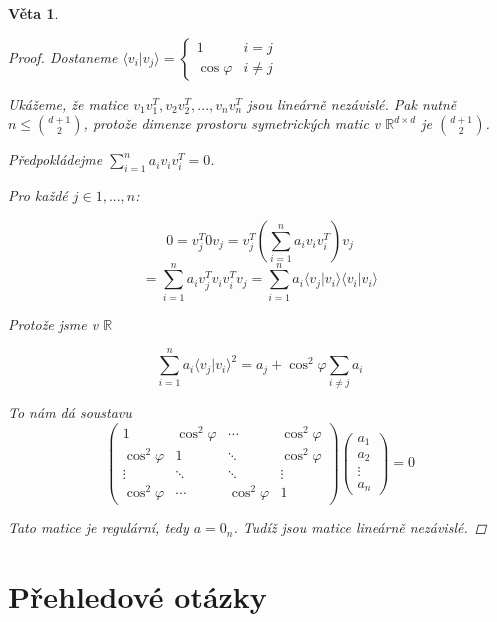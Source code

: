 \documentclass[10pt,a4paper]{article}
\theoremstyle{plain}
\newtheorem{veta}{Věta}
\begin{document}
\begin{enumerate}
\begin{veta}
\begin{proof}
Dostaneme $\langle v_i | v_j \rangle = \begin{cases} 1 & i=j \\ \cos \varphi & i \neq j \end{cases}$

\hfill

Ukážeme, že matice $v_1v_1^T, v_2v_2^T, ..., v_nv_n^T$ jsou lineárně nezávislé. Pak nutně $n \leq \binom{d+1}{2}$, protože dimenze prostoru symetrických matic v $\mathbb{R}^{d \times d}$ je $\binom{d+1}{2}$.

\hfill

Předpokládejme $\sum^n_{i=1}a_iv_iv_i^T = 0$.

Pro každé $j \in 1, ..., n$:

\[ 0 = v_j^T0v_j = v_j^T\left( \sum^n_{i=1}a_iv_iv_i^T \right) v_j \]
\[=  \sum^n_{i=1}a_i v_j^Tv_iv_i^Tv_j = \sum^n_{i=1}a_i \langle v_j | v_i \rangle \langle v_i | v_i \rangle
\]

Protože jsme v $\mathbb{R}$

\[ \sum^n_{i=1}a_i \langle v_j | v_i \rangle^2 = a_j + \cos^2 \varphi \sum_{i \neq j} a_i
\]

To nám dá soustavu
\[
\begin{pmatrix}
1 & \cos^2 \varphi & \cdots &  \cos^2 \varphi \\
\cos^2 \varphi & 1 &  \ddots & \cos^2 \varphi\\
\vdots &  \ddots & \ddots &  \vdots \\
\cos^2 \varphi & \cdots &  \cos^2 \varphi & 1 
\end{pmatrix}\begin{pmatrix}
a_1 \\ a_2 \\ \vdots \\ a_n
\end{pmatrix} = 0
\]

Tato matice je regulární, tedy $a = 0_n$.
Tudíž jsou matice lineárně nezávislé.

\end{proof}
\end{veta}


\end{enumerate}


\part{Přehledové otázky}
\end{document}

